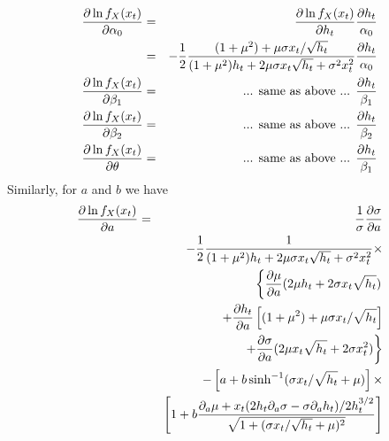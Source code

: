 \documentclass{book}
\begin{document}
\begin{eqnarray*}
  {\partial \ln f_X(x_t)\over \partial \alpha_0} &=&
  {\partial \ln f_X(x_t) \over \partial h_t}
  {\partial h_t \over \alpha_0} \\
  &=&
  -{1 \over 2} {
    (1 + \mu^2) + \mu\sigma x_t / \sqrt{h_t}
    \over
    (1 + \mu^2)h_t  +2\mu\sigma x_t \sqrt{h_t} + \sigma^2 x_t^2
  } {\partial h_t \over \alpha_0} \\
  {\partial \ln f_X(x_t)\over \partial \beta_1} &=&
  \text{... same as above ... } {\partial h_t \over \beta_1} \\
  {\partial \ln f_X(x_t)\over \partial \beta_2} &=&
  \text{... same as above ... } {\partial h_t \over \beta_2} \\
  {\partial \ln f_X(x_t)\over \partial \theta} &=&
  \text{... same as above ... } {\partial h_t \over \beta_1} \\
\end{eqnarray*}
Similarly, for $a$ and $b$ we have
\begin{eqnarray*}
  {\partial \ln f_X(x_t)\over \partial a} &=&
  {1 \over \sigma} {\partial \sigma \over \partial a} \\
  && -{1 \over 2} { 1
    \over
    (1 + \mu^2)h_t  +2\mu\sigma x_t \sqrt{h_t} + \sigma^2 x_t^2
  } \times \\
  && \left\{
    {\partial \mu \over \partial a}(2\mu h_t + 2\sigma x_t \sqrt{h_t}) \right.\\
  && + {\partial h_t \over \partial a} \left[
    (1 + \mu^2) + \mu\sigma x_t / \sqrt{h_t}
  \right] \\
  && \left.
    + {\partial \sigma \over \partial a}
    (2\mu x_t \sqrt{h_t} + 2\sigma x_t^2)
  \right\} \\
  && -\left[
    a + b\sinh^{-1}(\sigma x_t / \sqrt{h_t} + \mu)
  \right] \times \\
  && \left[
    1 + b {\partial_a \mu + x_t
      (2h_t\partial_a\sigma - \sigma\partial_ah_t) / 2h_t^{3/2}
      \over
      \sqrt{1 + (\sigma x_t / \sqrt{h_t} + \mu)^2}
    }
  \right]
\end{eqnarray*}
\end{document}
